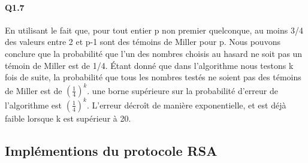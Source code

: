 \documentclass{article}
\begin{document}
\paragraph*{Q1.7}
En utilisant le fait que, pour tout entier p non premier quelconque, au moins 3/4 des valeurs entre 2 et p-1 sont des témoins de Miller pour p. \newline
Nous pouvons conclure que la probabilité que l'un des nombres choisis au hasard ne soit pas un témoin de Miller est de 1/4. Étant donné que dans l'algorithme nous testons k fois de suite, la probabilité que tous les nombres testés ne soient pas des témoins de Miller est de $(\frac{1}{4})^k$.\newline
une borne supérieure sur la probabilité d’erreur de l’algorithme est $(\frac{1}{4})^k$.
L'erreur décroît de manière exponentielle, et est déjà faible lorsque k est supérieur à 20.

\subsection{Implémentions du protocole RSA}
\end{document}
